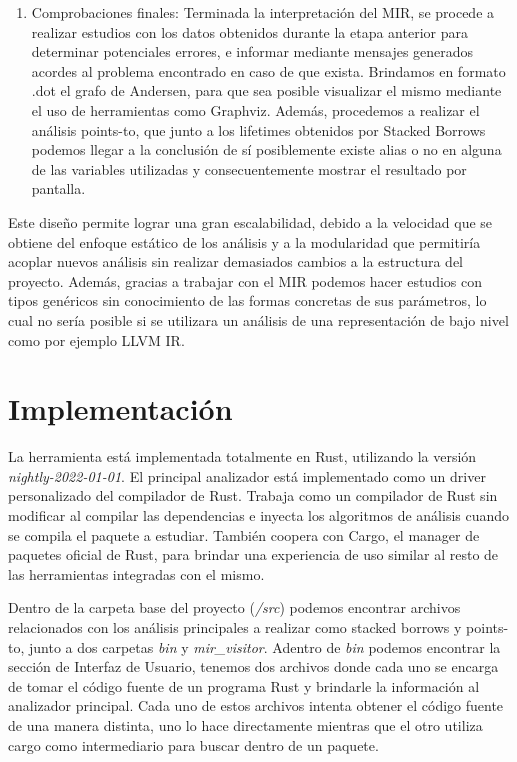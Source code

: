\begin{enumerate}
    \item Comprobaciones finales: Terminada la interpretación del MIR, se procede a realizar  estudios con los datos obtenidos durante la etapa anterior para determinar potenciales errores, e informar mediante mensajes generados acordes al problema encontrado en caso de que exista. Brindamos en formato .dot el grafo de Andersen, para que sea posible visualizar el mismo mediante el uso de herramientas como Graphviz. Además, procedemos a realizar el análisis points-to, que junto a los lifetimes obtenidos por Stacked Borrows podemos llegar a la conclusión de sí posiblemente existe alias o no en alguna de las variables utilizadas y consecuentemente mostrar el resultado por pantalla.
\end{enumerate}

Este diseño permite lograr una gran escalabilidad, debido a la velocidad que se obtiene del enfoque estático de los análisis y a la modularidad que permitiría acoplar nuevos análisis sin realizar demasiados cambios a la estructura del proyecto. Además, gracias a trabajar con el MIR podemos hacer estudios con tipos genéricos sin conocimiento de las formas concretas de sus parámetros, lo cual no sería posible si se utilizara un análisis de una representación de bajo nivel como por ejemplo LLVM IR.

\section{Implementación}

La herramienta está implementada totalmente en Rust, utilizando la versión \textit{nightly-2022-01-01}. El principal analizador está implementado como un driver personalizado del compilador de Rust. Trabaja como un compilador de Rust sin modificar al compilar las dependencias e inyecta los algoritmos de análisis cuando se compila el paquete a estudiar.
También coopera con Cargo, el manager de paquetes oficial de Rust, para brindar una experiencia de uso similar al resto de las herramientas integradas con el mismo.

Dentro de la carpeta base del proyecto (\textit{/src}) podemos encontrar archivos relacionados con los análisis principales a realizar como stacked borrows y points-to, junto a dos carpetas \textit{bin} y \textit{mir\_visitor}. Adentro de \textit{bin} podemos encontrar la sección de Interfaz de Usuario, tenemos dos archivos donde cada uno se encarga de tomar el código fuente de un programa Rust y brindarle la información al analizador principal. Cada uno de estos archivos intenta obtener el código fuente de una manera distinta, uno lo hace directamente mientras que el otro utiliza cargo como intermediario para buscar dentro de un paquete.

